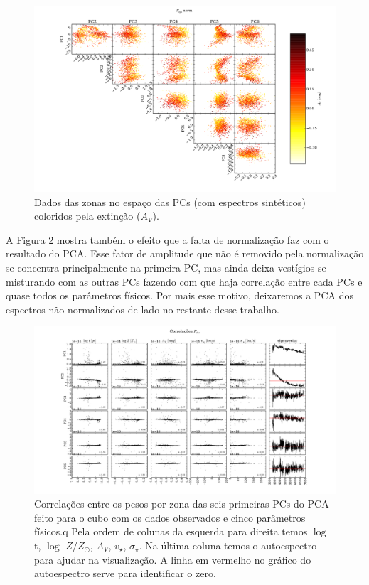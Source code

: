 \begin{figure}
	\includegraphics[width=1.4\textwidth, angle=-90]{figuras/K0277-f_syn_norm-corre_PCxPC_AV.pdf}
	\caption[Dados no espaço das PCs vs AV- $F_{syn}$ norm.]
    {Dados das zonas no espaço das PCs (com espectros sintéticos) coloridos pela extinção ($A_V$).}
    \label{fig:PCAaplic:K0277correfsynnormPCvsPC:AV}	
\end{figure}

A Figura \ref{fig:PCAaplic:K0277correfobs} mostra também o efeito que a falta de normalização faz com o resultado do PCA.
Esse fator de amplitude que não é removido pela normalização se concentra principalmente na primeira PC, mas ainda
deixa vestígios se misturando com as outras PCs fazendo com que haja correlação entre cada PCs e quase todos os parâmetros físicos. Por mais esse motivo, deixaremos a PCA dos espectros não normalizados de lado no restante desse trabalho.

\begin{figure}
    \includegraphics[width=1.3\textwidth, angle=-90]{figuras/K0277-correl-f_obs-PCvsPhys.pdf}
	\caption[Correlações PCs vs. par\^ametros f\'isicos - $F_{obs}$.]
    {Correlações entre os pesos por zona das seis primeiras PCs do PCA feito para o cubo com os dados observados e cinco
    parâmetros físicos.q Pela ordem de colunas da esquerda para direita temos $\log$ t, $\log$ $Z / Z_{\odot}$, $A_V$,
    $v_{\star}$, $\sigma_{\star}$. Na última coluna temos o autoespectro para ajudar na visualização. A linha em
    vermelho no gráfico do autoespectro serve para identificar o zero.}
    \label{fig:PCAaplic:K0277correfobs}
\end{figure}



